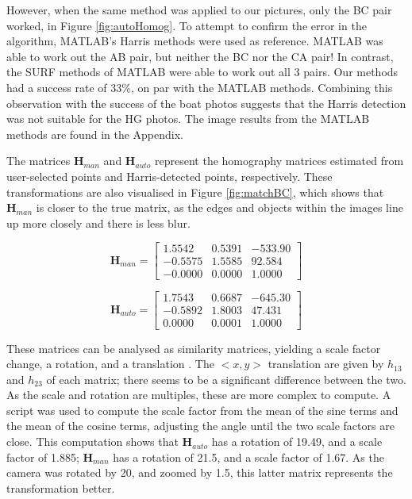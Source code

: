 \documentclass[a4paper, 10pt, conference]{ieeeconf}
\begin{document}
However, when the same method was applied to our pictures, only the BC pair worked, in Figure \ref{fig:autoHomog}. To attempt to confirm the error in the algorithm, MATLAB's Harris methods were used as reference. MATLAB was able to work out the AB pair, but neither the BC nor the CA pair! In contrast, the SURF methods of MATLAB were able to work out all 3 pairs. Our methods had a success rate of 33\%, on par with the MATLAB methods. Combining this observation with the success of the boat photos suggests that the Harris detection was not suitable for the HG photos. The image results from the MATLAB methods are found in the Appendix.


The matrices $\textbf{H}_{man}$ and $\textbf{H}_{auto}$ represent the homography matrices estimated from user-selected points and Harris-detected points, respectively. These transformations are also visualised in Figure \ref{fig:matchBC}, which shows that $\textbf{H}_{man}$ is closer to the true matrix, as the edges and objects within the images line up more closely and there is less blur.


\begin{equation} \label{eqn:manHomog}
\textbf{H}_{man} = \begin{bmatrix}
     1.5542 &  0.5391 & -533.90 \\
    -0.5575 &  1.5585 &  92.584 \\
    -0.0000 &  0.0000 &  1.0000
\end{bmatrix}
\end{equation}

\begin{equation} \label{eqn:autoHomog}
\textbf{H}_{auto} = \begin{bmatrix}
     1.7543 &  0.6687 & -645.30 \\
    -0.5892 &  1.8003 &  47.431 \\
     0.0000 &  0.0001 &  1.0000
\end{bmatrix}
\end{equation}

These matrices can be analysed as similarity matrices, yielding a scale factor change, a rotation, and a translation \cite{notes}. The $<x, y>$ translation are given by $h_{13}$ and $h_{23}$ of each matrix; there seems to be a significant difference between the two. As the scale and rotation are multiples, these are more complex to compute. A script was used to compute the scale factor from the mean of the sine terms and the mean of the cosine terms, adjusting the angle until the two scale factors are close. This computation shows that $\textbf{H}_{auto}$ has a rotation of 19.49\degree, and a scale factor of 1.885; $\textbf{H}_{man}$ has a rotation of 21.5\degree, and a scale factor of 1.67. As the camera was rotated by 20\degree, and zoomed by 1.5, this latter matrix represents the transformation better.
\end{document}
